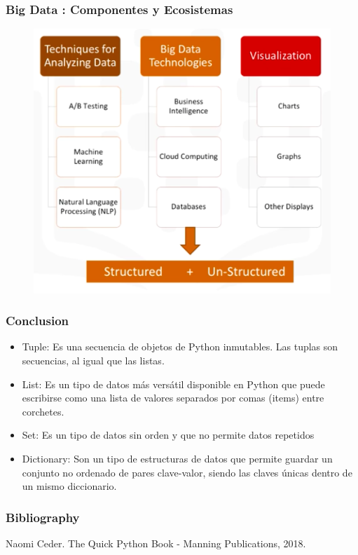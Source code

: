 \documentclass{beamer}
\begin{document}
\begin{frame}
\frametitle{Big Data : Componentes y Ecosistemas }
\begin{figure}
\includegraphics[scale=0.45]{img/4_BigData_Components_Ecosystems}
\end{figure}
\end{frame}





\begin{frame}
\frametitle{Conclusion}
\begin{itemize}
\item Tuple: Es una secuencia de objetos de Python inmutables. Las tuplas son secuencias, al igual que las listas.
\item List: Es un tipo de datos más versátil disponible en Python que puede escribirse como una lista de valores separados por comas (items) entre corchetes.
\item Set: Es un tipo de datos sin orden y que no permite datos repetidos
\item Dictionary: Son un tipo de estructuras de datos que permite guardar un conjunto no ordenado de pares clave-valor, siendo las claves únicas dentro de un mismo diccionario.

\end{itemize}
\end{frame}

\begin{frame}
\frametitle{Bibliography}

\begin{thebibliography}{0000}
  \bibitem{} Naomi Ceder. The Quick Python Book - Manning Publications, 2018.
\end{thebibliography}
\end{frame}
\end{document}
